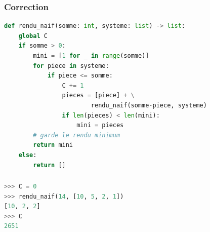 \documentclass[svgnames,11pt]{beamer}
\begin{document}
\begin{frame}[fragile]
\frametitle{Correction}
\begin{center}
\begin{lstlisting}[language=Python , basicstyle=\ttfamily\small, xleftmargin=0.2em, xrightmargin=-2em]
def rendu_naif(somme: int, systeme: list) -> list:
    global C
    if somme > 0:
        mini = [1 for _ in range(somme)] 
        for piece in systeme:
            if piece <= somme:
                C += 1
                pieces = [piece] + \
                        rendu_naif(somme-piece, systeme)
                if len(pieces) < len(mini):
                    mini = pieces
        # garde le rendu minimum
        return mini
    else:
        return []
\end{lstlisting}
\end{center}

\end{frame}
\begin{frame}[fragile]
    \frametitle{}

\begin{center}
\begin{lstlisting}[language=Python , basicstyle=\ttfamily\small, xleftmargin=0.2em, xrightmargin=2em]
>>> C = 0
>>> rendu_naif(14, [10, 5, 2, 1])
[10, 2, 2]
>>> C
2651
\end{lstlisting}
\end{center}

\end{frame}
\end{document}
